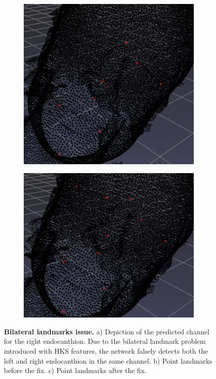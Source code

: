 \documentclass[class=article, crop=false]{standalone}
\begin{document}
\begin{figure}[b]
\begin{subfigure}[b]{0.3402\textwidth}
   \includegraphics[width=\textwidth]{thesis/methods/import/imgs/b.png}
   \caption{}
   \label{fig:sym_ldmksb}
   \end{subfigure}
   \begin{subfigure}[b]{0.3728\textwidth}
    \includegraphics[width=\textwidth]{thesis/methods/import/imgs/c.png}
    \caption{}
    \label{fig:sym_ldmksc}
    \end{subfigure}
  \caption{\textbf{Bilateral landmarks issue.}
    \small a) Depiction of the predicted channel for the right endocanthion. Due to the bilateral landmark problem introduced with HKS features, the network falsely detects both the left and right endocanthion in the same channel. b) Point landmarks before the fix. c) Point landmarks after the fix.
   }
    
\end{figure}
\end{document}
